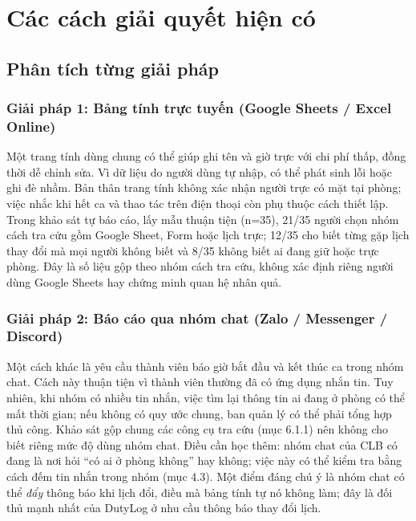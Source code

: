 \section{Các cách giải quyết hiện có}
\subsection{Phân tích từng giải pháp}
\subsubsection{Giải pháp 1: Bảng tính trực tuyến (Google Sheets / Excel Online)}
Một trang tính dùng chung có thể giúp ghi tên và giờ trực với chi phí thấp, đồng thời dễ chỉnh sửa. Vì dữ liệu do người dùng tự nhập, có thể phát sinh lỗi hoặc ghi đè nhầm. Bản thân trang tính không xác nhận người trực có mặt tại phòng; việc nhắc khi hết ca và thao tác trên điện thoại còn phụ thuộc cách thiết lập. Trong khảo sát tự báo cáo, lấy mẫu thuận tiện (n=35), 21/35 người chọn nhóm cách tra cứu gồm Google Sheet, Form hoặc lịch trực; 12/35 cho biết từng gặp lịch thay đổi mà mọi người không biết và 8/35 không biết ai đang giữ hoặc trực phòng. Đây là số liệu gộp theo nhóm cách tra cứu, không xác định riêng người dùng Google Sheets hay chứng minh quan hệ nhân quả.
\subsubsection{Giải pháp 2: Báo cáo qua nhóm chat (Zalo / Messenger / Discord)}
Một cách khác là yêu cầu thành viên báo giờ bắt đầu và kết thúc ca trong nhóm chat. Cách này thuận tiện vì thành viên thường đã có ứng dụng nhắn tin. Tuy nhiên, khi nhóm có nhiều tin nhắn, việc tìm lại thông tin ai đang ở phòng có thể mất thời gian; nếu không có quy ước chung, ban quản lý có thể phải tổng hợp thủ công. Khảo sát gộp chung các công cụ tra cứu (mục 6.1.1) nên không cho biết riêng mức độ dùng nhóm chat. Điều cần học thêm: nhóm chat của CLB có đang là nơi hỏi ``có ai ở phòng không'' hay không; việc này có thể kiểm tra bằng cách đếm tin nhắn trong nhóm (mục 4.3). Một điểm đáng chú ý là nhóm chat có thể \emph{đẩy} thông báo khi lịch đổi, điều mà bảng tính tự nó không làm; đây là đối thủ mạnh nhất của DutyLog ở nhu cầu thông báo thay đổi lịch.
